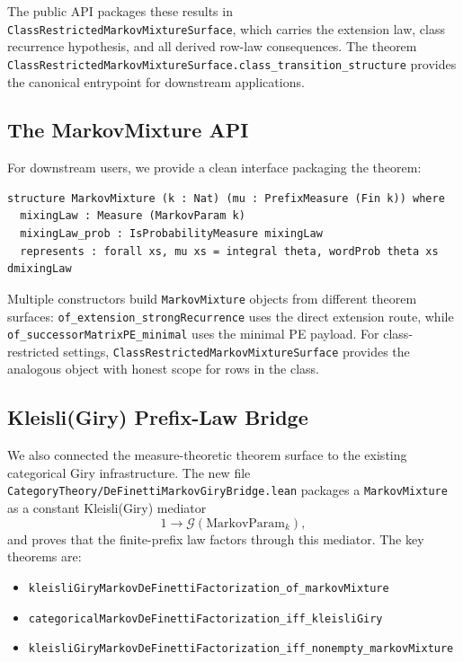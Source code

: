 \documentclass[11pt,a4paper]{article}
\theoremstyle{definition}
\begin{document}
The public API packages these results in \texttt{ClassRestrictedMarkovMixtureSurface},
which carries the extension law, class recurrence hypothesis, and all derived
row-law consequences. The theorem
\texttt{ClassRestrictedMarkovMixtureSurface.class\_transition\_structure}
provides the canonical entrypoint for downstream applications.

\subsection{The MarkovMixture API}

For downstream users, we provide a clean interface packaging the theorem:

\begin{lstlisting}
structure MarkovMixture (k : Nat) (mu : PrefixMeasure (Fin k)) where
  mixingLaw : Measure (MarkovParam k)
  mixingLaw_prob : IsProbabilityMeasure mixingLaw
  represents : forall xs, mu xs = integral theta, wordProb theta xs dmixingLaw
\end{lstlisting}

Multiple constructors build \texttt{MarkovMixture} objects from different
theorem surfaces: \texttt{of\_extension\_strongRecurrence} uses the direct
extension route, while \texttt{of\_successorMatrixPE\_minimal} uses the
minimal PE payload. For class-restricted settings,
\texttt{ClassRestrictedMarkovMixtureSurface} provides the analogous object
with honest scope for rows in the class.

\subsection{Kleisli(Giry) Prefix-Law Bridge}

We also connected the measure-theoretic theorem surface to the existing
categorical Giry infrastructure. The new file
\texttt{CategoryTheory/DeFinettiMarkovGiryBridge.lean} packages a
\texttt{MarkovMixture} as a constant Kleisli(Giry) mediator
\[
1 \to \mathcal{G}(\mathrm{MarkovParam}_k),
\]
and proves that the finite-prefix law factors through this mediator. The key
theorems are:
\begin{itemize}
\item \texttt{kleisliGiryMarkovDeFinettiFactorization\_of\_markovMixture}
\item \texttt{categoricalMarkovDeFinettiFactorization\_iff\_kleisliGiry}
\item \texttt{kleisliGiryMarkovDeFinettiFactorization\_iff\_nonempty\_markovMixture}
\end{itemize}
\end{document}
